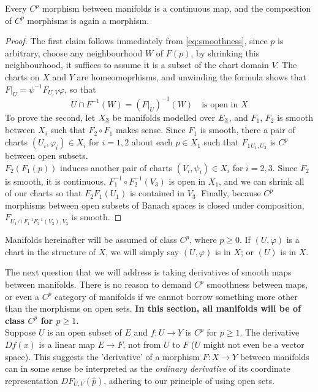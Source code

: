 \documentclass[../main-v2-manifolds.tex]{subfiles}
\begin{document}
\begin{wts}\label{prop:smoothness-implies-cont-functorality}
    Every $C^p$ morphism between manifolds is a continuous map, and the composition of $C^p$ morphisms is again a morphism.
\end{wts}
\begin{proof}
    The first claim follows immediately from \cref{eq:smoothness}, since $p$ is arbitrary, choose any neighbourhood $W$ of $F(p)$, by shrinking this neighbourhood, it suffices to assume it is a subset of the chart domain $V$. The charts on $X$ and $Y$ are homeomoprhisms, and unwinding the formula shows that $F\vert_{U} = \psi^{-1}F_{U,V}\varphi$, so that
    \[
        U\cap F^{-1}(W) = (F\vert_U)^{-1}(W)\quad\text{is open in }X
    \]
    To prove the second, let $\UL{X}[3]$ be manifolds modelled over $\UL{E}[3]$, and $F_1$, $F_2$ is smooth between $X_i$ such that $F_2\circ F_1$ makes sense. Since $F_1$ is smooth, there a pair of charts $(U_i,\varphi_i)\in X_i$ for $i = 1,2$ about each $p\in X_1$ such that $F_1{_{U_1,U_2}}$ is $C^p$ between open subsets.\\

    $F_2(F_1(p))$ induces another pair of charts $(V_i,\psi_i)\in X_i$ for $i=2,3$. Since $F_2$ is smooth, it is continuous. $F_1^{-1}\circ F_2^{-1}(V_3)$ is open in $X_1$, and we can shrink all of our charts so that $F_2F_1(U_1)$ is contained in $V_3$. Finally, because $C^p$ morphisms between open subsets of Banach spaces is closed under composition, $F_{U_1\cap F_1^{-1}F_2^{-1}(V_3), V_3}$ is smooth.
\end{proof}
\begin{remark}
    Manifolds hereinafter will be assumed of class $C^p$, where $p\geq 0$. If $(U,\varphi)$ is a chart in the structure of $X$, we will simply say $(U,\varphi)$ is in $X$; or $(U)$ is in $X$.
\end{remark}
The next question that we will address is taking derivatives of smooth maps between manifolds. There is no reason to demand $C^p$ smoothness between maps, or even a $C^p$ category of manifolds if we cannot borrow something more other than the morphisms on open sets. \textbf{In this section, all manifolds will be of class $C^p$ for $p\geq 1$.}\\

Suppose $U$ is an open subset of $E$ and $f: U\to Y$ is $C^p$ for $p\geq 1$. The derivative $Df(x)$ is a linear map $E\to F$, not from $U$ to $F$ ($U$ might not even be a vector space). This suggests the 'derivative' of a morphism $F: X\to Y$ between manifolds can in some sense be interpreted as the \emph{ordinary derivative} of its coordinate representation $DF_{U,V}(\hat{p})$, adhering to our principle of using open sets.\\
\end{document}
